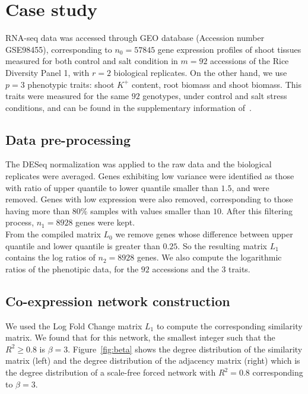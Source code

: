 \documentclass[12pt,journal, onecolumn]{IEEEtran}
\begin{document}
\section{Case study}
RNA-seq data was accessed through GEO database \cite{GEOAcces90:online} (Accession number GSE98455), corresponding to $n_0=57845$ gene expression profiles of shoot tissues measured for both control and salt condition in $m=92$ accessions of the Rice Diversity Panel 1, with $r=2$ biological replicates. On the other hand, we use $p=3 $ phenotypic traits: shoot $K^+$ content, root biomass and shoot biomass. This traits were measured for the same $92$ genotypes, under  control and salt stress conditions, and can be found in the supplementary information of~\cite{campbell2017allelic}.\\

\subsection{Data pre-processing}
The DESeq normalization was applied to the raw data and the biological replicates were averaged. Genes exhibiting low variance were identified as those with ratio of upper quantile to lower quantile smaller than $1.5$, and were removed. Genes with low expression were also removed, corresponding to those having more than $80\%$ samples with values smaller than $10$. After this filtering process, $n_1 = 8928$ genes were kept.\\

From the compiled matrix $L_0$ we remove genes whose difference between upper quantile and lower quantile is greater than $0.25$. So the resulting matrix $L_1$ contains the log ratios of $n_2 = 8928$ genes. We also compute the logarithmic ratios of the phenotipic data, for the $92$ accessions and the $3$ traits.\\   

\subsection{Co-expression network construction}
We used the Log Fold Change matrix $L_1$ to compute the corresponding similarity matrix. 
We found that for this network, the smallest integer such that the $R^2 \geq 0.8 $ is $\beta=3$. Figure~\ref{fig:beta} shows the degree distribution of the similarity matrix (left) and the degree distribution of the adjacency matrix (right) which is the degree distribution of a scale-free forced network with $R^2 = 0.8$ corresponding to $\beta = 3$.
\end{document}

